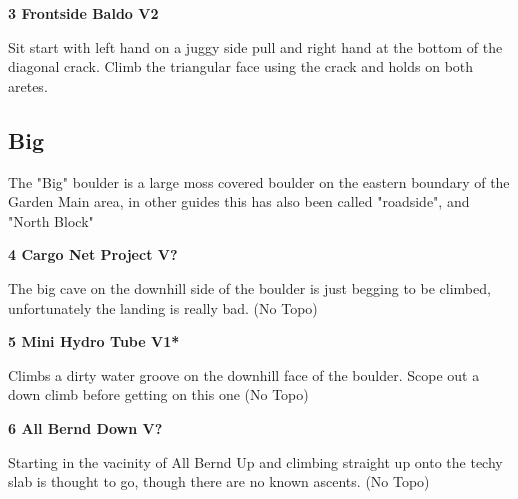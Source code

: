 \begin{multicols}{2}
		
			
			\needspace{1.5cm}
\label{rt:Frontside Baldo}
\colorbox{green!20}{
\parbox{0.95\linewidth}{
\textbf{
3 Frontside Baldo V2  
}}}

			\begin{adjustwidth}{0.5cm}{}			
			Sit start with left hand on a juggy side pull and right hand at the bottom of the diagonal crack. Climb the triangular face using the crack and holds on both aretes.
			\end{adjustwidth}
			
			
		
		
		\needspace{1.5cm}
		\subsection*{Big}\label{bf:Big}
		The "Big" boulder is a large moss covered boulder on the eastern boundary of the Garden Main area, in other guides this has also been called "roadside", and "North Block"\\
	
		
			
			\needspace{1.5cm}
\label{rt:Cargo Net Project}
\colorbox{black!20}{
\parbox{0.95\linewidth}{
\textbf{
4 Cargo Net Project V?  
}}}

			\begin{adjustwidth}{0.5cm}{}			
			The big cave on the downhill side of the boulder is just begging to be climbed, unfortunately the landing is really bad. (No Topo)
			\end{adjustwidth}
			
			
			
			\needspace{1.5cm}
\label{rt:Mini Hydro Tube}
\colorbox{green!20}{
\parbox{0.95\linewidth}{
\textbf{
5 Mini Hydro Tube V1*  \warn
}}}

			\begin{adjustwidth}{0.5cm}{}			
			Climbs a dirty water groove on the downhill face of the boulder. Scope out a down climb before getting on this one (No Topo)
			\end{adjustwidth}
			
			
			
			\needspace{1.5cm}
\label{rt:All Bernd Down}
\colorbox{black!20}{
\parbox{0.95\linewidth}{
\textbf{
6 All Bernd Down V?  
}}}

			\begin{adjustwidth}{0.5cm}{}			
			Starting in the vacinity of All Bernd Up and climbing straight up onto the techy slab is thought to go, though there are no known ascents. (No Topo)
			\end{adjustwidth}
			

\end{multicols}
